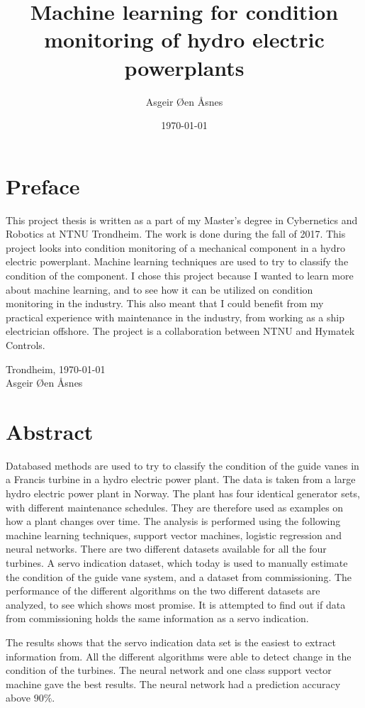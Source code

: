 \documentclass{article}
\title{Machine learning for condition monitoring of hydro electric powerplants}
\author{Asgeir Øen Åsnes }
\date{\today}
\begin{document}





\newpage
{}
\section*{Preface}
    This project thesis is written as a part of my Master's degree in Cybernetics and Robotics at NTNU Trondheim. The work is done during the fall of 2017. This project looks into condition monitoring of a mechanical component in a hydro electric powerplant. Machine learning techniques are used to try to classify the condition of the component. I chose this project because I wanted to learn more about machine learning, and to see how it can be utilized on condition monitoring in the industry. This also meant that I could benefit from my practical experience with maintenance in the industry, from working as a ship electrician offshore. The project is a collaboration between NTNU and Hymatek Controls.  

    
    \begin{center}
    Trondheim, \today \\
    \vspace{1.5cm}
    Asgeir Øen Åsnes
    \end{center}
\clearpage

\section*{Abstract}
    Databased methods are used to try to classify the condition of the guide vanes in a Francis turbine in a hydro electric power plant. The data is taken from a large hydro electric power plant in Norway. The plant has four identical generator sets, with different maintenance schedules. They are therefore used as examples on how a plant changes over time. The analysis is performed using the following machine learning techniques, support vector machines, logistic regression and neural networks. There are two different datasets available for all the four turbines. A servo indication dataset, which today is used to manually estimate the condition of the guide vane system, and a dataset from commissioning. The performance of the different algorithms on the two different datasets are analyzed, to see which shows most promise. It is attempted to find out if data from commissioning holds the same information as a servo indication.  
    
    
    The results shows that the servo indication data set is the easiest to extract information from. All the different algorithms were able to detect change in the condition of the turbines. The neural network and one class support vector machine gave the best results. The neural network had a prediction accuracy above $90\%$.  
    
\end{document}
